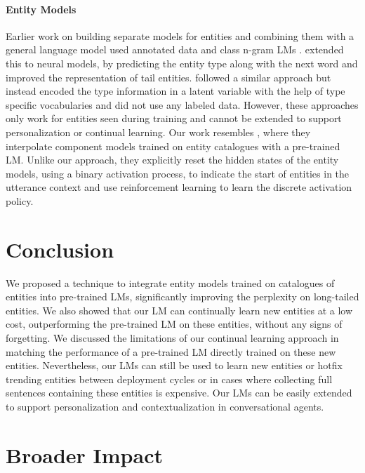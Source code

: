 \documentclass{article}
\begin{document}
\paragraph{Entity Models} Earlier work on building separate models for entities and combining them with a general language model used annotated data and class n-gram LMs \citep{ward1996class}. \citep{parvez} extended this to neural models, by predicting the entity type along with the next word and improved the representation of tail entities. \citep{liuaugmented} followed a similar approach but instead encoded the type information in a latent variable with the help of type specific vocabularies and did not use any labeled data. However, these approaches only work for entities seen during training and cannot be extended to support personalization or continual learning. Our work resembles \citep{filimonov2020neural}, where they interpolate component models trained on entity catalogues with a pre-trained LM. Unlike our approach, they explicitly reset the hidden states of the entity models, using a binary activation process, to indicate the start of entities in the utterance context and use reinforcement learning to learn the discrete activation policy.


\section{Conclusion}
We proposed a technique to integrate entity models trained on catalogues of entities into pre-trained LMs, significantly improving the perplexity on long-tailed entities. We also showed that our LM can continually learn new entities at a low cost, outperforming the pre-trained LM on these entities, without any signs of forgetting. We discussed the limitations of our continual learning approach in matching the performance of a pre-trained LM directly trained on these new entities. Nevertheless, our LMs can still be used to learn new entities or hotfix trending entities between deployment cycles or in cases where collecting full sentences containing these entities is expensive. Our LMs can be easily extended to support personalization and contextualization in conversational agents. 


\section{Broader Impact}
\end{document}
